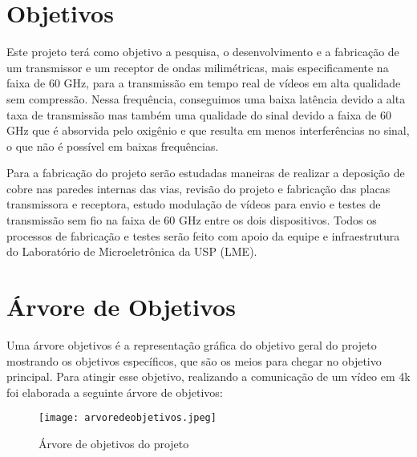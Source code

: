 \section{Objetivos}

Este projeto terá como objetivo a pesquisa, o desenvolvimento e a fabricação de um transmissor e um receptor de ondas milimétricas, mais especificamente na faixa de 60 GHz, para a transmissão em tempo real de vídeos em alta qualidade sem compressão. Nessa frequência, conseguimos uma baixa latência devido a alta taxa de transmissão mas também uma qualidade do sinal devido a faixa de 60 GHz que é absorvida pelo oxigênio e que resulta em menos interferências no sinal, o que não é possível em baixas frequências.

Para a fabricação do projeto  serão estudadas maneiras de realizar a deposição de cobre nas paredes internas das vias, revisão do projeto e fabricação das placas transmissora e receptora, estudo modulação de vídeos para envio e testes de transmissão sem fio na faixa de 60 GHz entre os dois dispositivos. Todos os processos de fabricação e testes serão feito com apoio da equipe e infraestrutura do Laboratório de Microeletrônica da USP (LME).

\section{Árvore de Objetivos}

Uma árvore objetivos é a representação gráfica do objetivo geral do projeto mostrando os objetivos específicos, que são os meios para chegar no objetivo principal. Para atingir esse objetivo, realizando a comunicação de um vídeo em 4k foi elaborada a seguinte árvore de objetivos:

\begin{figure}[htbp]
    \centering
    \caption{Árvore de objetivos do projeto}
    \texttt{[image: arvoredeobjetivos.jpeg]}
    
    \centering
    \label{Árvore}
\end{figure}